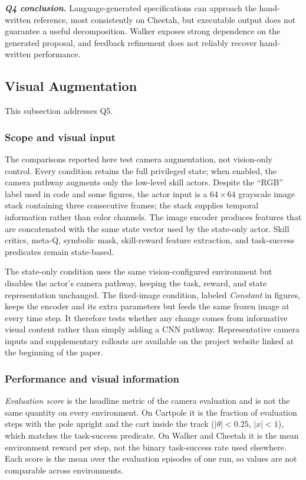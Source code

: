 \documentclass[conference,letterpaper,10pt]{IEEEtran}
\begin{document}
\par\noindent\emph{\textbf{Q4 conclusion.}}
Language-generated specifications can approach the hand-written reference, most consistently on Cheetah, but executable output does not guarantee a useful decomposition. Walker exposes strong dependence on the generated proposal, and feedback refinement does not reliably recover hand-written performance.


\subsection{Visual Augmentation}
This subsection addresses Q5.

\subsubsection{Scope and visual input}
The comparisons reported here test camera augmentation, not vision-only control. Every condition retains the full privileged state; when enabled, the camera pathway augments only the low-level skill actors. Despite the ``RGB'' label used in code and some figures, the actor input is a $64\times64$ grayscale image stack containing three consecutive frames; the stack supplies temporal information rather than color channels. The image encoder produces features that are concatenated with the same state vector used by the state-only actor. Skill critics, meta-Q, symbolic mask, skill-reward feature extraction, and task-success predicates remain state-based.

The state-only condition uses the same vision-configured environment but disables the actor's camera pathway, keeping the task, reward, and state representation unchanged. The fixed-image condition, labeled \emph{Constant} in figures, keeps the encoder and its extra parameters but feeds the same frozen image at every time step. It therefore tests whether any change comes from informative visual content rather than simply adding a CNN pathway. Representative camera inputs and supplementary rollouts are available on the project website linked at the beginning of the paper.

\subsubsection{Performance and visual information}
\emph{Evaluation score} is the headline metric of the camera evaluation and is not the same quantity on every environment. On Cartpole it is the fraction of evaluation steps with the pole upright and the cart inside the track ($|\theta|<0.25$, $|x|<1$), which matches the task-success predicate. On Walker and Cheetah it is the mean environment reward per step, not the binary task-success rate used elsewhere. Each score is the mean over the evaluation episodes of one run, so values are not comparable across environments.
\end{document}
